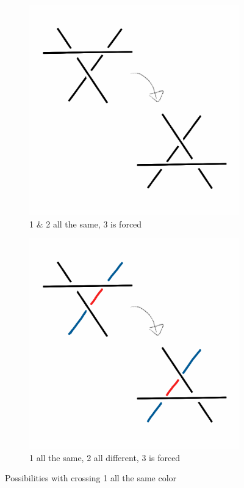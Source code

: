 \documentclass[12pt,letterpaper]{article}
\theoremstyle{definition}
\begin{document}
\begin{figure}[h!]
    \centering
    \begin{subfigure}{.4\textwidth}
        \centering
        \includegraphics[width=\textwidth]{knotpics/1s2s.png}
        \caption{1 \& 2 all the same, 3 is forced}
    \end{subfigure}
    \qquad
    \begin{subfigure}{.4\textwidth}
        \centering
        \includegraphics[width=\textwidth]{knotpics/1s2d.png}
        \caption{1 all the same, 2 all different, 3 is forced}
    \end{subfigure}
    \caption{Possibilities with crossing 1 all the same color}
\end{figure}
\end{document}
